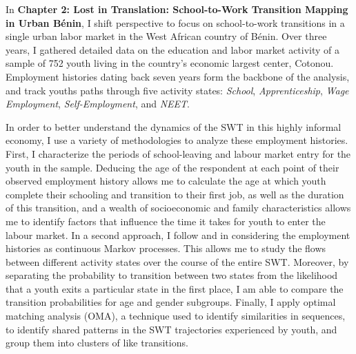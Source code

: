 \documentclass[
  a4paper, twoside, 12pt]{book}
\begin{document}
In \textbf{Chapter 2: Lost in Translation: School-to-Work Transition Mapping in Urban Bénin}, I shift perspective to focus on school-to-work transitions in a single urban labor market in the West African country of Bénin. Over three years, I gathered detailed data on the education and labor market activity of a sample of 752 youth living in the country's economic largest center, Cotonou. Employment histories dating back seven years form the backbone of the analysis, and track youths paths through five activity states: \emph{School}, \emph{Apprenticeship}, \emph{Wage Employment}, \emph{Self-Employment}, and \emph{NEET}.

In order to better understand the dynamics of the SWT in this highly informal economy, I use a variety of methodologies to analyze these employment histories. First, I characterize the periods of school-leaving and labour market entry for the youth in the sample. Deducing the age of the respondent at each point of their observed employment history allows me to calculate the age at which youth complete their schooling and transition to their first job, as well as the duration of this transition, and a wealth of socioeconomic and family characteristics allows me to identify factors that influence the time it takes for youth to enter the labour market. In a second approach, I follow \textcite{bosch2007} and \textcite{cunningham2011} in considering the employment histories as continuous Markov processes. This allows me to study the flows between different activity states over the course of the entire SWT. Moreover, by separating the probability to transition between two states from the likelihood that a youth exits a particular state in the first place, I am able to compare the transition probabilities for age and gender subgroups. Finally, I apply optimal matching analysis (OMA), a technique used to identify similarities in sequences, to identify shared patterns in the SWT trajectories experienced by youth, and group them into clusters of like transitions.
\end{document}
